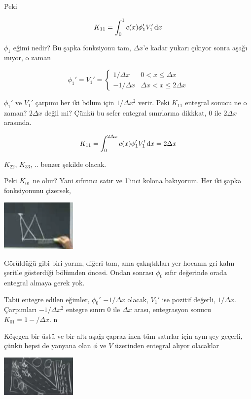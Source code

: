 \documentclass[12pt,fleqn]{article}\usepackage{../../common}
\begin{document}
Peki

$$
K_{11} = \int_{0}^{1} c(x) \phi_1' V_1' \,\mathrm{d} x
$$

$\phi_1$ eğimi nedir? Bu şapka fonksiyonu tam, $\Delta x$'e kadar yukarı
çıkıyor sonra aşağı ınıyor, o zaman

$$
\phi_1' = V_1' =
\left\{ \begin{array}{rc}
1/\Delta x & 0 < x \le \Delta x \\
-1/\Delta x & \Delta x < x \le 2\Delta x 
\end{array} \right.
$$

$\phi_1'$ ve $V_1'$ çarpımı her iki bölüm için $1/\Delta x^2$ verir. Peki
$K_{11}$ entegral sonucu ne o zaman? $2 \Delta x$ değil mi? Çünkü bu sefer
entegral sınırlarına dikkkat, 0 ile $2\Delta x$ arasında. 

$$
K_{11} = \int_{0}^{2\Delta x} c(x) \phi_1' V_1' \,\mathrm{d} x = 2\Delta x
$$

$K_{22}$, $K_{33}$, .. benzer şekilde olacak. 

Peki $K_{01}$ ne olur? Yani sıfırıncı satır ve 1'inci kolona bakıyorum. Her iki
şapka fonksiyonunu çizersek,

\includegraphics[width=10em]{compscieng_1_18_07.png}

Görüldüğü gibi biri yarım, diğeri tam, ama çakıştıkları yer hocanın gri
kalın şeritle gösterdiği bölümden öncesi. Ondan sonrası $\phi_0$ sıfır
değerinde orada entegral almaya gerek yok. 

Tabii entegre edilen eğimler, $\phi_0'$ $-1/\Delta x$ olacak, $V_1'$ ise
pozitif değerli, $1/\Delta x$. Çarpımları $-1/\Delta x^2$ entegre sınırı 0 ile
$\Delta x$ arası, entegrasyon sonucu $K_{01} = 1-/\Delta x$. n

Köşegen bir üstü ve bir altı aşağı çapraz inen tüm satırlar için aynı şey
geçerli, çünkü hepsi de yanyana olan $\phi$ ve $V$ üzerinden entegral alıyor
olacaklar

\includegraphics[width=10em]{compscieng_1_18_08.png}
\end{document}
